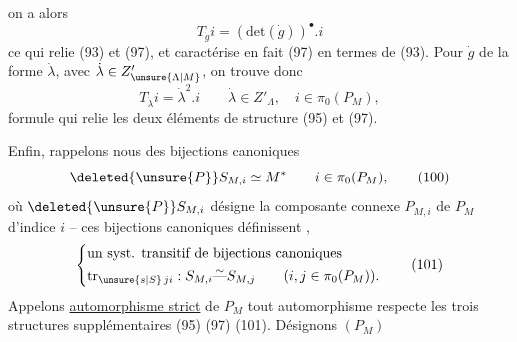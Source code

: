 on a alors
\[
T_{\dot g}i=(\mathrm{det}(\dot g))^\bullet.i\tag*{(98)}
\]
ce qui relie (93) et (97), et caractérise en fait (97) en termes de (93). Pour $\dot g$ de la forme $\dot\lambda$, avec $\dot\lambda\in Z'_{\unsure{\Lambda|M}}$, on trouve donc
\[
T_{\dot\lambda}i=\dot\lambda^2.i\qquad\dot\lambda\in Z'_\Lambda,\quad i\in\pi_0(P_M),\tag*{(99)}
\]
formule qui relie les deux éléments de structure (95) et (97).

Enfin, rappelons nous des bijections canoniques
\[
\deleted{\unsure{P}}S_{M,i}\simeq M^*\qquad i\in\pi_0(P_M),\tag*{(100)}
\]
où $\deleted{\unsure{P}}S_{M,i}$ désigne la  composante connexe $P_{M,i}$ de $P_M$ d'indice $i$ -- ces bijections canoniques définissent ,
\[
\left\{\begin{aligned}
&\text{un syst. transitif de bijections canoniques}\\
&\mathrm{tr}_{\unsure{s|S}\,ji}:S_{M,i}\overset{\sim}{\text{---}} S_{M,j}
\qquad(i,j\in\pi_0(P_M)).
\end{aligned}\right.\tag*{(101)}
\]
Appelons \uline{automorphisme strict} de $P_M$ tout automorphisme  respecte les trois structures supplémentaires (95) (97) (101).
Désignons  $(P_M)$
